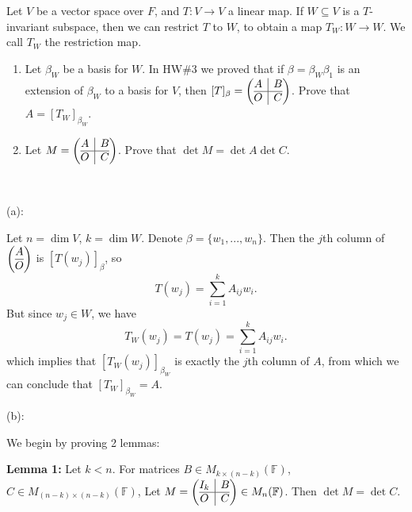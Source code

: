 \documentclass{eh-homework}
\begin{document}
    \begin{question}{6}
    Let $V$ be a vector space over $F$, and $T : V \to V$ a linear map. If $W \subseteq V$ is a $T$-invariant subspace, then we can restrict \(T\) to \(W\), to obtain a map \(T_W : W \to W\). We call \(T_W\) the restriction map.
    
    \begin{enumerate}[label=(\alph*)]
        \item Let \(\beta _W\) be a basis for \(W\). In HW\#3 we proved that if \(\beta = \beta _W \beta _1\) is an extension of \(\beta_W\) to a basis for \(V\), then \([T]_\beta = \left( \begin{array}{@{}c|c@{}}
            A & B \\
            \hline
            O & C \\
        \end{array}\right)\). Prove that \(A = [T_W]_{\beta_W}\).

        \item Let \(M = \left(\begin{array}{@{}c|c@{}}
            A & B \\
            \hline
            O & C \\
        \end{array}\right)\). Prove that \(\det M = \det A \det C\).
    \end{enumerate}
    \tcblower
    \ 

    (a):

    Let \(n = \dim V\), \(k = \dim W\). Denote \(\beta = \{ w_1, ..., w_n \}\). Then the \(j\)th column of \(\left( \begin{array}{@{}c@{}}
        A \\
        \hline
        O \\
    \end{array} \right)\) is \([T(w_j)]_\beta\), so
    \[
        T(w_j) = \sum_{i=1}^{k} A_{ij} w_i.
    \]
    But since \(w_j \in W\), we have
    \[
        T_W(w_j) = T(w_j) = \sum_{i=1}^{k} A_{ij} w_i.
    \]
    which implies that \([T_W(w_j)]_{\beta_W}\) is exactly the \(j\)th column of \(A\), from which we can conclude that \([T_W]_{\beta_W} = A\).

    \medskip

    (b):

    We begin by proving 2 lemmas:

    \textbf{Lemma 1:} Let \(k < n\). For matrices \(B \in M_{k\times (n-k)}(\mathbb{F})\), \(C \in M_{(n-k)\times (n-k)}(\mathbb{F})\), Let \(M = \left( \begin{array}{@{}c|c@{}}
        I_k & B \\
        \hline
        O & C
    \end{array} \right) \in M_n(\mathbb{F})\). Then \(\det M = \det C\).


\end{question}
\end{document}
